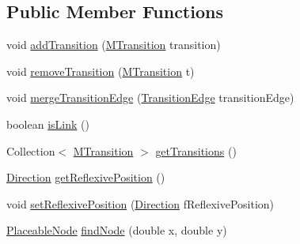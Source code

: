 \subsection*{Public Member Functions}
\begin{DoxyCompactItemize}
\item 
void \hyperlink{classorg_1_1tzi_1_1use_1_1gui_1_1views_1_1diagrams_1_1statemachine_1_1_transition_edge_a0d8c0d7fe15a1eacba6ed2329b84be7c}{add\-Transition} (\hyperlink{classorg_1_1tzi_1_1use_1_1uml_1_1mm_1_1statemachines_1_1_m_transition}{M\-Transition} transition)
\item 
void \hyperlink{classorg_1_1tzi_1_1use_1_1gui_1_1views_1_1diagrams_1_1statemachine_1_1_transition_edge_aaf9c034ef94211c9e497d33c284c7c0a}{remove\-Transition} (\hyperlink{classorg_1_1tzi_1_1use_1_1uml_1_1mm_1_1statemachines_1_1_m_transition}{M\-Transition} t)
\item 
void \hyperlink{classorg_1_1tzi_1_1use_1_1gui_1_1views_1_1diagrams_1_1statemachine_1_1_transition_edge_a89b32d3c354f83657b44093f760a0833}{merge\-Transition\-Edge} (\hyperlink{classorg_1_1tzi_1_1use_1_1gui_1_1views_1_1diagrams_1_1statemachine_1_1_transition_edge}{Transition\-Edge} transition\-Edge)
\item 
boolean \hyperlink{classorg_1_1tzi_1_1use_1_1gui_1_1views_1_1diagrams_1_1statemachine_1_1_transition_edge_a377b2c396ebede975e409eda61a2d7a6}{is\-Link} ()
\item 
Collection$<$ \hyperlink{classorg_1_1tzi_1_1use_1_1uml_1_1mm_1_1statemachines_1_1_m_transition}{M\-Transition} $>$ \hyperlink{classorg_1_1tzi_1_1use_1_1gui_1_1views_1_1diagrams_1_1statemachine_1_1_transition_edge_ab800c15b0a15b0d7da387101693474d2}{get\-Transitions} ()
\item 
\hyperlink{enumorg_1_1tzi_1_1use_1_1gui_1_1views_1_1diagrams_1_1util_1_1_direction}{Direction} \hyperlink{classorg_1_1tzi_1_1use_1_1gui_1_1views_1_1diagrams_1_1statemachine_1_1_transition_edge_a7d0698c876d49417534d2cc86146f3c5}{get\-Reflexive\-Position} ()
\item 
void \hyperlink{classorg_1_1tzi_1_1use_1_1gui_1_1views_1_1diagrams_1_1statemachine_1_1_transition_edge_ae16d9f0f82db6616ada95c31e036856b}{set\-Reflexive\-Position} (\hyperlink{enumorg_1_1tzi_1_1use_1_1gui_1_1views_1_1diagrams_1_1util_1_1_direction}{Direction} f\-Reflexive\-Position)
\item 
\hyperlink{classorg_1_1tzi_1_1use_1_1gui_1_1views_1_1diagrams_1_1elements_1_1_placeable_node}{Placeable\-Node} \hyperlink{classorg_1_1tzi_1_1use_1_1gui_1_1views_1_1diagrams_1_1statemachine_1_1_transition_edge_a5c4baed6e8d7dac36a4e53a1e0900ff2}{find\-Node} (double x, double y)

\end{DoxyCompactItemize}
